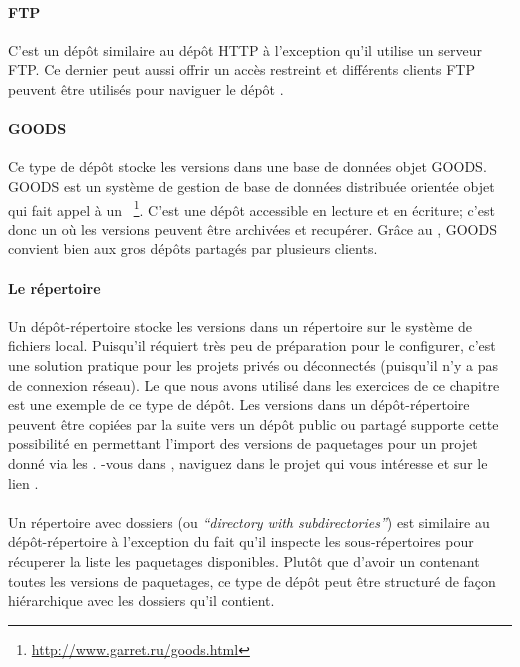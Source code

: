 \documentclass[a4paper,10pt,twoside]{book}
\begin{document}
\paragraph{FTP} C'est un dépôt similaire au dépôt HTTP à l'exception
qu'il utilise un serveur FTP. Ce dernier peut aussi offrir un accès
restreint et différents clients FTP peuvent être utilisés pour
naviguer le dépôt \MC.

\paragraph{GOODS}
Ce type de dépôt stocke les versions dans une base de données objet GOODS.
GOODS est un système de gestion de base de données distribuée orientée
objet qui fait appel à un ~\footnote{\url{http://www.garret.ru/goods.html}}.
C'est une dépôt accessible en lecture et en écriture; c'est donc un
où les versions peuvent être archivées et recupérer. Grâce au , GOODS convient bien aux gros dépôts partagés par
plusieurs clients.

\paragraph{Le répertoire} Un dépôt-répertoire stocke les versions dans
un répertoire sur le système de fichiers local. Puisqu'il réquiert
très peu de préparation pour le configurer, c'est une solution
pratique pour les projets privés ou déconnectés (puisqu'il n'y a pas
de connexion réseau).
Le  que nous avons utilisé dans les exercices de ce
chapitre est une exemple de ce type de dépôt. Les versions dans un
dépôt-répertoire peuvent être copiées par la suite vers un dépôt
public ou partagé  \sqsrc supporte cette possibilité
en permettant l'import des versions de paquetages pour un projet donné
via les .  
-vous dans 
 \sqsrc, naviguez dans le projet qui vous intéresse et
\clickz sur le lien .

\paragraph{}  Un répertoire avec
dossiers (ou \emph{``directory with subdirectories''}) est similaire
au dépôt-répertoire à l'exception du fait qu'il inspecte les
sous-répertoires pour récuperer la liste les paquetages
disponibles. Plutôt que d'avoir un 
contenant toutes les versions de paquetages, ce type de dépôt peut
être structuré de façon hiérarchique avec les dossiers qu'il contient.
\end{document}
